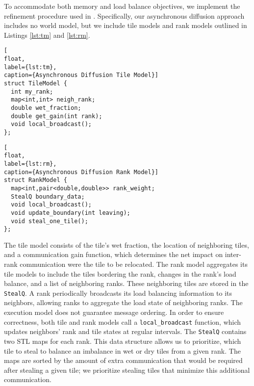 To accommodate both memory and load balance objectives, we implement the refinement procedure used in \cite{KKMC}.
Specifically, our asynchronous diffusion approach includes no world model, but we include tile models and rank models outlined in Listings \ref{lst:tm} and \ref{lst:rm}.


\begin{lstlisting}[
float,
label={lst:tm},
caption={Asynchronous Diffusion Tile Model}]
struct TileModel {
  int my_rank;
  map<int,int> neigh_rank;
  double wet_fraction;  
  double get_gain(int rank);
  void local_broadcast();
};
\end{lstlisting}

\begin{lstlisting}[
float,
label={lst:rm},
caption={Asynchronous Diffusion Rank Model}]
struct RankModel {
  map<int,pair<double,double>> rank_weight;
  StealQ boundary_data;
  void local_broadcast();
  void update_boundary(int leaving);
  void steal_one_tile();
};
\end{lstlisting}

The tile model consists of the tile's wet fraction, the location of neighboring tiles, and a communication gain function, which determines the net impact on inter-rank communication were the tile to be relocated.
The rank model aggregates its tile models to include the tiles bordering the rank, changes in the rank's load balance, and a list of neighboring ranks. These neighboring tiles are stored in the \texttt{StealQ}.
A rank periodically broadcasts its load balancing information to its neighbors,
allowing ranks to aggregate the load state of neighboring ranks.
The execution model does not guarantee message ordering. In order to ensure correctness, both tile and rank models call a \texttt{local\_broadcast} function, which updates neighbors' rank and tile states at regular intervals.
The \texttt{StealQ} contains two STL maps for each rank. This data structure allows us to prioritize, which tile to steal to balance an imbalance in wet or dry tiles from a given rank. The maps are sorted by the amount of extra communication that would be required after stealing a given tile; we prioritize stealing tiles that minimize this additional communication.

